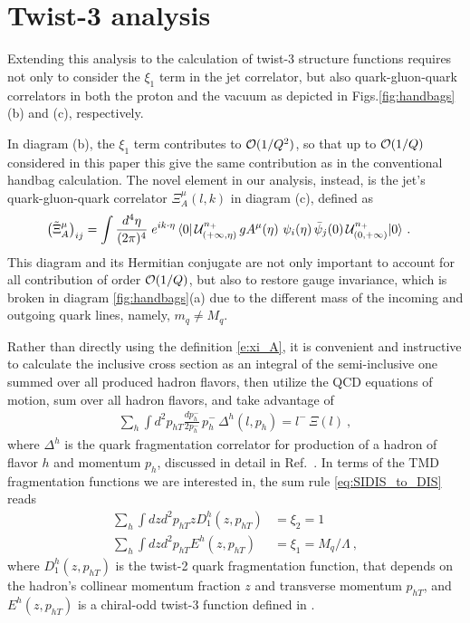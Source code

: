 \documentclass[preprintnumbers,floatfix,nofootinbib]{revtex4}
\newcommand{\de}{d}                    %
\newcommand{\ii}{i}                    %
\newcommand{\mj}{M_q}
\newcommand{\mq}{m_q}
\begin{document}
\section{Twist-3 analysis}

Extending this analysis to the calculation of twist-3
structure functions requires not only to consider the $\xi_1$ term in the jet
correlator, but also quark-gluon-quark correlators in both the proton and the
vacuum as depicted in Figs.\ref{fig:handbags}(b) and (c), respectively. 

In diagram (b), the $\xi_1$ term contributes to ${\cal O}(1/Q^2)$, so that up to ${\cal O}(1/Q)$ considered in this paper this give the same contribution as in the conventional handbag calculation. The novel element in our analysis, instead, is the jet's quark-gluon-quark correlator $\Xi_A^{\mu}(l,k)$ in diagram (c), defined as 
\begin{equation} 
\begin{split} 
  \left(\tilde \Xi_A^{\mu} \right)_{ij} &=
   \int \frac{\de^4 \eta}{(2\pi)^{4}}\;
   e^{\ii k \cdot \eta}\,
   \langle 0|\,
   {\cal U}^{n_+}_{(+\infty,\eta)}\,
   g A^{\mu}(\eta)\,
   \,\psi_i(\eta)
   \,\bar{\psi}_j(0)\,
   {\cal U}^{n_+}_{(0,+\infty)}
   |0\rangle \ .
\label{e:xi_A}
\end{split} 
\end{equation}  
This diagram and its Hermitian conjugate are not only important to account for
all contribution of order ${\cal O}(1/Q)$, but also to restore gauge invariance, which is broken in diagram \ref{fig:handbags}(a) due to the different mass
of the incoming and outgoing quark lines, namely, $\mq \neq \mj$. 

Rather than directly using the definition \eqref{e:xi_A}, it is convenient and instructive to calculate the inclusive cross section as an integral of the semi-inclusive one summed over all produced hadron flavors, then utilize the QCD equations of motion, sum over all hadron flavors, and take advantage of  
\begin{align}
  \label{eq:SIDIS_to_DIS}
  \sum_h \int d^2p_{hT}\frac{dp_h^-}{2p_h^-} \,p_h^- \, \Delta^h(l,p_h) = l^-\,\Xi(l) \ , 
\end{align}
where $\Delta^h$ is the quark fragmentation correlator for production of a
hadron of flavor $h$ and momentum $p_h$, discussed in detail in Ref.~\cite{Bacchetta:2006tn}. In terms of
the TMD fragmentation functions we are interested in, the sum rule \eqref{eq:SIDIS_to_DIS} reads 
\begin{align}
  \label{eq:SIDIS_to_DIS_TMDlevel1}
  \sum_h \int dz d^2p_{hT} z D_1^h(z,p_{hT}) & = \xi_2 = 1   \\
  \label{eq:SIDIS_to_DIS_TMDlevel2}
  \sum_h \int dz d^2p_{hT} E^h(z,p_{hT}) & = \xi_1 = \mj / \Lambda\ ,
\end{align}
where $D_1^h(z,p_{hT})$ is the twist-2 quark fragmentation function, that depends on the hadron's collinear momentum fraction $z$ and transverse
momentum $p_{hT}$, and $E^h(z,p_{hT})$ is a chiral-odd twist-3 function
defined in \cite{Bacchetta:2006tn}. 
\end{document}
